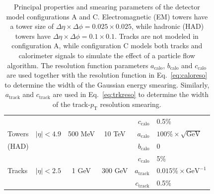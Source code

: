 \documentclass[11pt,letterpaper]{article}
\newcommand{\GeV}{\text{GeV}}
\newcommand{\pt}{\ensuremath{p_{\text{T}}}}
\newcommand{\acalo}{\ensuremath{a_{\text{calo}}}}
\newcommand{\bcalo}{\ensuremath{b_{\text{calo}}}}
\newcommand{\ccalo}{\ensuremath{c_{\text{calo}}}}
\newcommand{\atrk}{\ensuremath{a_{\text{track}}}}
\newcommand{\ctrk}{\ensuremath{c_{\text{track}}}}
\begin{document}
\begin{table}
\begin{tabular}{|l|c|c|c|r@{\ =\ }l|}
           &                &         &           & \ccalo & 0.5\%                                    \\
Towers     & $|\eta| < 4.9$ & 500 MeV &  10 TeV   & \acalo & $100\%\times\sqrt{\GeV}$                 \\
(HAD)      &                &         &           & \bcalo & 0                                        \\
           &                &         &           & \ccalo & 5\%                                      \\
Tracks     & $|\eta| < 2.5$ &  1 GeV  &  300 GeV  & \atrk  & $0.015\%\times\GeV^{-1}$                  \\
           &                &         &           & \ctrk & 0.5\%                                     \\
\hline
\end{tabular}
\caption{Principal properties and smearing parameters of the detector model configurations A and C. Electromagnetic (EM) towers have a tower size of $\Delta\eta\times\Delta\phi = 0.025\times0.025$, while hadronic (HAD) towers have $\Delta\eta\times\Delta\phi = 0.1\times0.1$. Tracks are not modeled in configuration A, while configuration C models both tracks and calorimeter signals to simulate the effect of a particle flow algorithm. The resolution function parameters \acalo, \bcalo{} and \ccalo{} are used together with the resolution function in Eq.~\ref{eq:caloreso} to determine the width of the Gaussian energy smearing.
Similarly, \atrk{} and \ctrk{} are used in Eq.~\ref{eq:trkreso} to determine the width of the track-\pt{} resolution smearing.}
\label{tab:detmodel}
\end{table}
\end{document}
